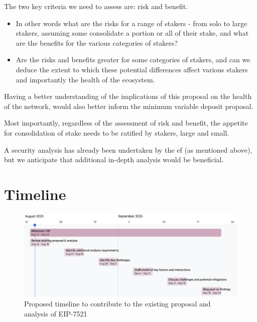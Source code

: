 \documentclass[UTF8]{article}
\begin{document}
The two key criteria we need to assess are: risk and benefit. 
\begin{itemize}
\item In other words what are the risks for a range of stakers - from solo to large stakers, assuming some consolidate a portion or all of their stake, and what are the benefits for the various categories of stakers?
\item  Are the risks and benefits greater for some categories of stakers, and can we deduce the extent to which these potential differences affect various stakers and importantly the health of the ecosystem.
\end{itemize}

Having a better understanding of the implications of this proposal on the health of the network, would also better inform the minimum variable deposit proposal. 

Most importantly, regardless of the assessment of risk and benefit, the appetite for consolidation of stake needs to be ratified by stakers, large and small.

A security analysis has already been undertaken by the \gls{ef} \cite{Neuder2023b} (as mentioned above), but we anticipate that additional in-depth analysis would be beneficial.

\clearpage
\section{Timeline}
\label{sec:timeline}

\begin{figure}[htbp]
\begin{center}
\includegraphics[width=\linewidth]{images/max-eb-timeline}
\caption{Proposed timeline to contribute to the existing proposal and analysis of EIP-7521}
\label{fig:timeline}
\end{center}
\end{figure}

\end{document}
